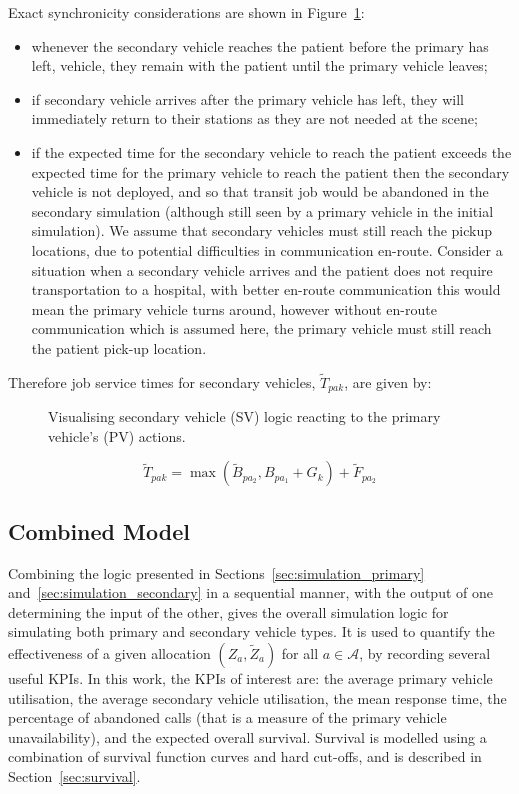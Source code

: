 \documentclass[numbers,webpdf,imaman]{ima-authoring-template}%
\begin{document}
Exact synchronicity considerations are shown in Figure~\ref{fig:sequential_logic}:
\begin{itemize}
  \item whenever the secondary vehicle reaches the patient before the primary
  has left, vehicle, they remain with the patient until the primary vehicle
  leaves;
  \item if secondary vehicle arrives after the primary vehicle has left, they
  will immediately return to their stations as they are not needed at the scene;
  \item if the expected time for the secondary vehicle to reach the patient
  exceeds the expected time for the primary vehicle to reach the patient then
  the secondary vehicle is not deployed, and so that transit job would be
  abandoned in the secondary simulation (although still seen by a primary
  vehicle in the initial simulation). We assume that secondary vehicles must
  still reach the pickup locations, due to potential difficulties in
  communication en-route. Consider a situation when a
  secondary vehicle arrives and the patient does not require transportation to
  a hospital, with better en-route communication this would mean the primary
  vehicle turns around, however without en-route communication which is
  assumed here, the primary vehicle must still reach the patient pick-up
  location.
\end{itemize}

Therefore job service times for secondary vehicles, $\tilde{T}_{pak}$, are
given by:

\begin{figure}
    \centering
    
    \caption{Visualising secondary vehicle (SV) logic reacting to the primary
    vehicle's (PV) actions.}
    \label{fig:sequential_logic}
\end{figure}

\begin{equation}
  \tilde{T}_{pak} = \max\left(\tilde{B}_{pa_2}, B_{pa_1} + G_k \right) + \tilde{F}_{pa_2}
\end{equation}

\subsection{Combined Model}\label{sec:combined_model}
Combining the logic presented in Sections~\ref{sec:simulation_primary}
and~\ref{sec:simulation_secondary} in a sequential manner, with the output of
one determining the input of the other, gives the overall simulation logic for
simulating both primary and secondary vehicle types. It is used to quantify
the effectiveness of a given allocation $(Z_a, \tilde{Z}_a)$ for all
$a \in \mathcal{A}$, by recording several useful KPIs.
In this work, the KPIs of interest are: the average primary vehicle
utilisation, the average secondary vehicle utilisation, the mean response
time, the percentage of abandoned calls (that is a measure of the primary
vehicle unavailability), and the expected overall survival. Survival is
modelled using a combination of survival function curves and hard cut-offs,
and is described in Section~\ref{sec:survival}.
\end{document}
